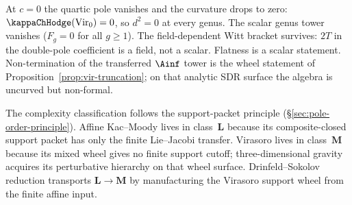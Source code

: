 At $c = 0$ the quartic pole vanishes and the curvature drops to
zero: $\kappaChHodge(\mathrm{Vir}_0) = 0$, so $d^2 = 0$ at every genus.
The scalar genus tower vanishes ($F_g = 0$ for all $g \ge 1$).
The field-dependent Witt bracket survives: $2T$ in the double-pole
coefficient is a field, not a scalar. Flatness is a scalar statement.
Non-termination of the transferred $\Ainf$ tower is the wheel statement
of Proposition~\ref{prop:vir-truncation}; on that analytic SDR surface
the algebra is uncurved but non-formal.

The complexity classification follows the support-packet principle
(\S\ref{sec:pole-order-principle}). Affine Kac--Moody lives in
class~$\mathbf{L}$ because its composite-closed support packet has
only the finite Lie--Jacobi transfer. Virasoro lives in
class~$\mathbf{M}$ because its mixed wheel gives no finite support
cutoff; three-dimensional gravity acquires its perturbative hierarchy
on that wheel surface. Drinfeld--Sokolov reduction transports
$\mathbf{L}\to\mathbf{M}$ by manufacturing the Virasoro support wheel
from the finite affine input.

